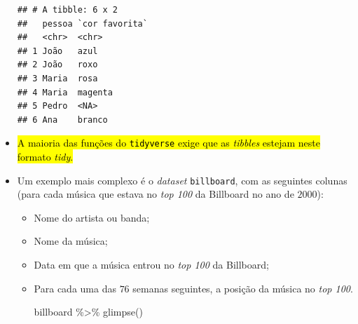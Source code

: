 \documentclass[
  11pt]{report}
\newenvironment{Shaded}{\begin{snugshade}}{\end{snugshade}}
\newcommand{\FunctionTok}[1]{\textcolor[rgb]{0.00,0.00,0.00}{#1}}
\newcommand{\NormalTok}[1]{#1}
\newcommand{\SpecialCharTok}[1]{\textcolor[rgb]{0.00,0.00,0.00}{#1}}
\renewenvironment{Shaded}{
    \begin{mdframed}[%
      roundcorner=2pt,%
      innerleftmargin=5pt,%
      innerrightmargin=5pt,%
      topline=true,%
      leftline=true,%
      rightline=true,%
      bottomline=true,%
      linewidth=0.5pt,%
      linecolor=black!20,%
      backgroundcolor=black!2,%
      skipabove=2ex,%
      skipbelow=2.5ex%
    ]%
  }
  {
    \end{mdframed}
  }
\begin{document}
\begin{itemize}
\begin{verbatim}
## # A tibble: 6 x 2
##   pessoa `cor favorita`
##   <chr>  <chr>         
## 1 João   azul          
## 2 João   roxo          
## 3 Maria  rosa          
## 4 Maria  magenta       
## 5 Pedro  <NA>          
## 6 Ana    branco
\end{verbatim}
\item
  {\hl{A maioria das funções do {\mbox{\texttt{tidyverse}}} exige que as \emph{tibbles} estejam neste formato \emph{tidy}.}}
\item
  Um exemplo mais complexo é o \emph{dataset} \texttt{billboard}, com as seguintes colunas (para cada música que estava no \emph{top 100} da Billboard no ano de $2000$):

  \begin{itemize}
  \item
    Nome do artista ou banda;
  \item
    Nome da música;
  \item
    Data em que a música entrou no \emph{top 100} da Billboard;
  \item
    Para cada uma das $76$ semanas seguintes, a posição da música no \emph{top 100}.

\begin{Shaded}
\begin{Highlighting}[]
\NormalTok{billboard }\SpecialCharTok{\%\textgreater{}\%} \FunctionTok{glimpse}\NormalTok{()}
\end{Highlighting}
\end{Shaded}


\end{itemize}
\end{itemize}
\end{document}

